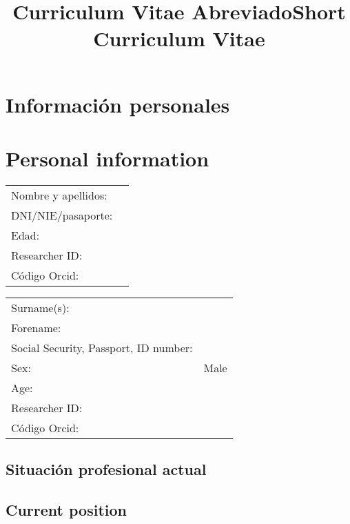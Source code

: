\documentclass[a4paper]{article}
\title{Curriculum Vitae Abreviado}
\title{Short Curriculum Vitae}
\author{ }
\def\english{1}
\begin{document}
\def\normalfont{\sffamily}
\sffamily
\maketitle

\ifx\english\undefined
\section{Información personales}
\else
\section{Personal information}
\fi

\ifx\english\undefined
\begin{tabular}{ll}
  Nombre y apellidos: &   \\
  DNI/NIE/pasaporte: &  \\
  Edad: &  \\
  Researcher ID: &  \\
  Código Orcid: & 
\end{tabular}
\else
\begin{tabular}{ll}
  Surname(s): &  \\
  Forename: &  \\
  Social Security, Passport, ID number: &  \\
  Sex: & Male \\
  Age: &  \\
  Researcher ID: &  \\
  Código Orcid: & 
\end{tabular}
\fi

\ifx\english\undefined
\subsection{Situación profesional actual}
\else
\subsection{Current position}
\fi
\end{document}
